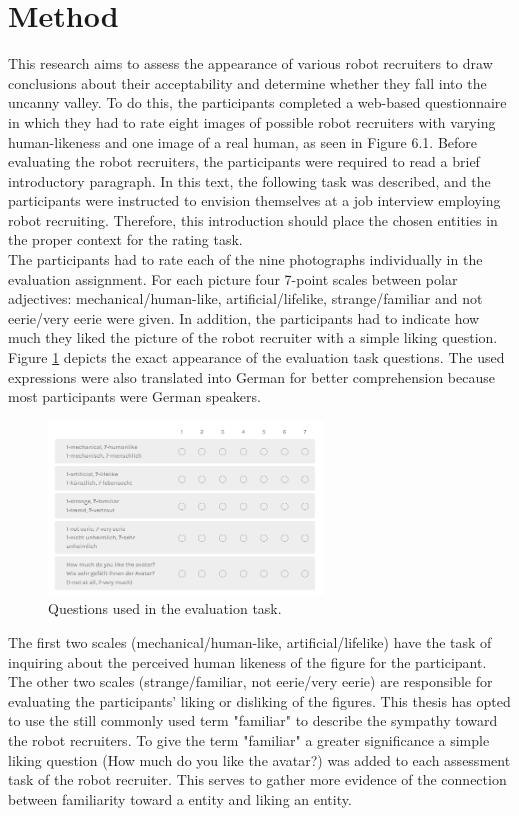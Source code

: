 \section{Method}
This research aims to assess the appearance of various robot recruiters to draw conclusions about their acceptability and determine whether they fall into the uncanny valley. To do this, the participants completed a web-based questionnaire in which they had to rate eight images of possible robot recruiters with varying human-likeness and one image of a real human, as seen in Figure 6.1. Before evaluating the robot recruiters, the participants were required to read a brief introductory paragraph. In this text, the following task was described, and the participants were instructed to envision themselves at a job interview employing robot recruiting. Therefore, this introduction should place the chosen entities in the proper context for the rating task. \\
The participants had to rate each of the nine photographs individually in the evaluation assignment. For each picture four 7-point scales between polar adjectives: mechanical/human-like, artificial/lifelike, strange/familiar and not eerie/very eerie were given. In addition, the participants had to indicate how much they liked the picture of the robot recruiter with a simple liking question. Figure \ref{fig:evaluation_task} depicts the exact appearance of the evaluation task questions. The used expressions were also translated into German for better comprehension because most participants were German speakers.
\begin{figure} %
    \centering
    \includegraphics[width=0.65\textwidth]{graphics/evaluation_task.png}
    \caption{Questions used in the evaluation task.}
    \label{fig:evaluation_task}
\end{figure}
The first two scales (mechanical/human-like, artificial/lifelike)  have the task of inquiring about the perceived human likeness of the figure for the participant. The other two scales (strange/familiar, not eerie/very eerie) are responsible for evaluating the participants' liking or disliking of the figures. This thesis has opted to use the still commonly used term "familiar" to describe the sympathy toward the robot recruiters. To give the term "familiar" a greater significance a simple liking question (How much do you like the avatar?) was added to each assessment task of the robot recruiter. This serves to gather more evidence of the connection between familiarity toward a entity and liking an entity.\\
